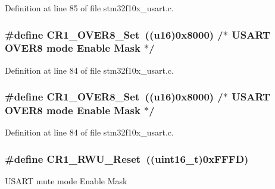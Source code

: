 Definition at line 85 of file stm32f10x\+\_\+usart.\+c.

\subsubsection[{\texorpdfstring{C\+R1\+\_\+\+O\+V\+E\+R8\+\_\+\+Set}{CR1_OVER8_Set}}]{\setlength{\rightskip}{0pt plus 5cm}\#define C\+R1\+\_\+\+O\+V\+E\+R8\+\_\+\+Set~(({\bf u16})0x8000)  /$\ast$ U\+S\+A\+R\+T O\+V\+E\+R8 mode Enable Mask $\ast$/}\hypertarget{group___u_s_a_r_t___private___defines_ga11495857ca81074790c376317382140f}{}\label{group___u_s_a_r_t___private___defines_ga11495857ca81074790c376317382140f}


Definition at line 84 of file stm32f10x\+\_\+usart.\+c.

\subsubsection[{\texorpdfstring{C\+R1\+\_\+\+O\+V\+E\+R8\+\_\+\+Set}{CR1_OVER8_Set}}]{\setlength{\rightskip}{0pt plus 5cm}\#define C\+R1\+\_\+\+O\+V\+E\+R8\+\_\+\+Set~(({\bf u16})0x8000)  /$\ast$ U\+S\+A\+R\+T O\+V\+E\+R8 mode Enable Mask $\ast$/}\hypertarget{group___u_s_a_r_t___private___defines_ga11495857ca81074790c376317382140f}{}\label{group___u_s_a_r_t___private___defines_ga11495857ca81074790c376317382140f}


Definition at line 84 of file stm32f10x\+\_\+usart.\+c.

\subsubsection[{\texorpdfstring{C\+R1\+\_\+\+R\+W\+U\+\_\+\+Reset}{CR1_RWU_Reset}}]{\setlength{\rightskip}{0pt plus 5cm}\#define C\+R1\+\_\+\+R\+W\+U\+\_\+\+Reset~(({\bf uint16\+\_\+t})0x\+F\+F\+F\+D)}\hypertarget{group___u_s_a_r_t___private___defines_ga064a46d19ffffddd410e969798d335ee}{}\label{group___u_s_a_r_t___private___defines_ga064a46d19ffffddd410e969798d335ee}
U\+S\+A\+RT mute mode Enable Mask 

